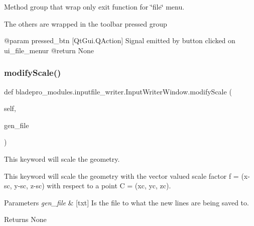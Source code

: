 Method group that wrap only exit function for \char`\"{}file\char`\"{} menu. 

The others are wrapped in the toolbar pressed group \begin{DoxyVerb}   @param pressed_btn [QtGui.QAction] Signal emitted by button clicked on ui_file_menur
   @return None\end{DoxyVerb}
 \hypertarget{classbladepro__modules_1_1inputfile__writer_1_1_input_writer_window_aa1bef88b3d57a567e44548155e7ec02f}{}\label{classbladepro__modules_1_1inputfile__writer_1_1_input_writer_window_aa1bef88b3d57a567e44548155e7ec02f} 
\subsubsection{\texorpdfstring{modify\+Scale()}{modifyScale()}}
{\footnotesize\ttfamily def bladepro\+\_\+modules.\+inputfile\+\_\+writer.\+Input\+Writer\+Window.\+modify\+Scale (\begin{DoxyParamCaption}\item[{}]{self,  }\item[{}]{gen\+\_\+file }\end{DoxyParamCaption})}



This keyword will scale the geometry. 

This keyword will scale the geometry with the vector valued scale factor f = (x-\/sc, y-\/sc, z-\/sc) with respect to a point C = (xc, yc, zc).


\begin{DoxyParams}{Parameters}
{\em gen\+\_\+file} & \mbox{[}txt\mbox{]} Is the file to what the new lines are being saved to. \\
\hline
\end{DoxyParams}
\begin{DoxyReturn}{Returns}
None 
\end{DoxyReturn}
\hypertarget{classbladepro__modules_1_1inputfile__writer_1_1_input_writer_window_a66f6209a0c4caa0ba5e25b5fd913eff5}{}\label{classbladepro__modules_1_1inputfile__writer_1_1_input_writer_window_a66f6209a0c4caa0ba5e25b5fd913eff5} 
